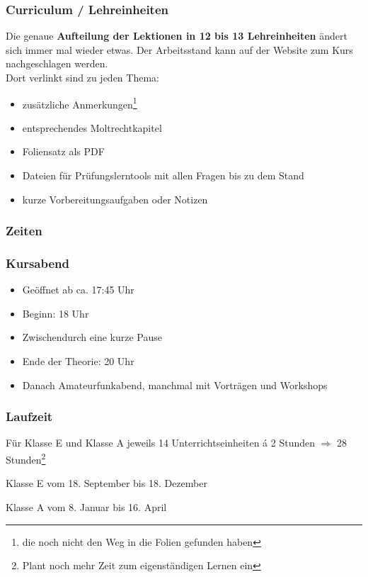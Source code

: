 \begin{frame}
    \frametitle{Curriculum / Lehreinheiten}

    Die genaue \textbf{Aufteilung der Lektionen in 12 bis 13 Lehreinheiten}
    ändert sich immer mal wieder etwas. Der Arbeitsstand kann auf der Website
    zum Kurs \hyperlink{refs}{\cite{curr}} nachgeschlagen werden. \\[2em]

    Dort verlinkt sind zu jeden Thema:

    \begin{itemize}
        \item zusätzliche Anmerkungen\footnote{die noch nicht den Weg in die
              Folien gefunden haben}
        \item entsprechendes Moltrechtkapitel
        \item Foliensatz als PDF
        \item Dateien für Prüfungslerntools mit allen Fragen bis zu dem Stand
        \item kurze Vorbereitungsaufgaben oder Notizen
    \end{itemize}

\end{frame}

\subsubsection{Zeiten}

\begin{frame}
  \frametitle{Kursabend}

  \begin{itemize}
    \item Geöffnet ab ca. 17:45 Uhr
    \item Beginn: 18 Uhr
    \item Zwischendurch eine kurze Pause
    \item Ende der Theorie: 20 Uhr
    \item Danach Amateurfunkabend, manchmal mit Vorträgen und Workshops
  \end{itemize}
\end{frame}

\begin{frame}
  \frametitle{Laufzeit}

  Für Klasse E und Klasse A jeweils 14 Unterrichtseinheiten á 2 Stunden $\Rightarrow$ 28 Stunden\footnote{Plant noch mehr Zeit zum eigenständigen Lernen ein}

  Klasse E vom 18. September bis 18. Dezember

  Klasse A vom 8. Januar bis 16. April
\end{frame}

